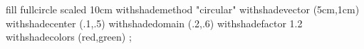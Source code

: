 \startMPpage

    fill fullcircle scaled 10cm
        withshademethod "circular"
        withshadevector (5cm,1cm)
        withshadecenter (.1,.5)
        withshadedomain (.2,.6)
        withshadefactor 1.2
        withshadecolors (red,green)
    ;

\stopMPpage
